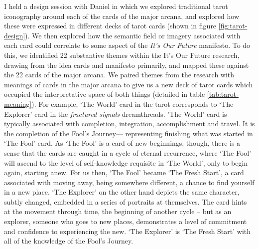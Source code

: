 I held a design session with Daniel in which we explored traditional tarot iconography around each of the cards of the major arcana, and explored how these were expressed in different decks of tarot cards (shown in figure \ref{fig:tarot-design}). We then explored how the semantic field or imagery associated with each card could correlate to some aspect of the \emph{It’s Our Future} manifesto. To do this, we identified 22 substantive themes within the It’s Our Future research, drawing from the idea cards and manifesto primarily, and  mapped these against the 22 cards of the major arcana. We paired themes from the research with meanings of cards in the major arcana to give us a new deck of tarot cards which occupied the interpretative space of both things (detailed in table \ref{tab:tarot-meaning}). For example, `The World' card in the tarot corresponds to `The Explorer' card in the \textit{fractured signals} dreamthreads. ’The World’ card is typically associated with completion, integration, accomplishment and travel. It is the completion of the Fool’s Journey— representing finishing what was started in ‘The Fool’ card. As ‘The Fool’ is a card of new beginnings, though, there is a sense that the cards are caught in a cycle of eternal recurrence, where `The Fool' will ascend to the level of self-knowledge requisite in `The World', only to begin again, starting anew. For us then, `The Fool' became ‘The Fresh Start’, a card associated with moving away, being somewhere different, a chance to find yourself in a new place. ‘The Explorer’ on the other hand depicts the same character, subtly changed, embedded in a series of portraits at themselves. The card hints at the movement through time, the beginning of another cycle – but as an explorer, someone who goes to new places, demonstrates a level of commitment and confidence to experiencing the new. `The Explorer' is `The Fresh Start' with all of the knowledge of the Fool’s Journey. 

